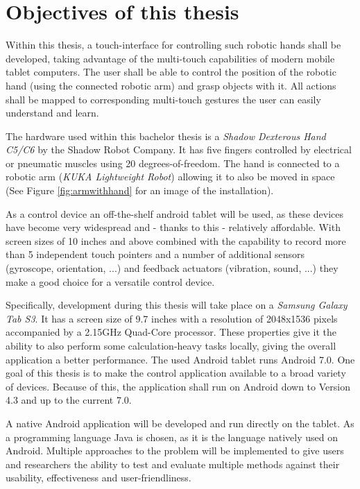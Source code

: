 \section{Objectives of this thesis}

Within this thesis, a touch-interface for controlling such robotic hands shall be developed, taking advantage of the multi-touch capabilities of modern mobile tablet computers. The user shall be able to control the position of the robotic hand (using the connected robotic arm) and grasp objects with it. All actions shall be mapped to corresponding multi-touch gestures the user can easily understand and learn.

The hardware used within this bachelor thesis is a \textit{Shadow Dexterous Hand C5/C6} by the Shadow Robot Company. It has five fingers controlled by electrical or pneumatic muscles using 20 degrees-of-freedom\cite{web:robothand:spec}. The hand is connected to a robotic arm (\textit{KUKA Lightweight Robot}) allowing it to also be moved in space (See Figure \ref{fig:armwithhand} for an image of the installation).

As a control device an off-the-shelf android tablet will be used, as these devices have become very widespread and - thanks to this - relatively affordable. With screen sizes of 10 inches and above combined with the capability to record more than 5 independent touch pointers and a number of additional sensors (gyroscope, orientation, ...) and feedback actuators (vibration, sound, ...) they make a good choice for a versatile control device.

Specifically, development during this thesis will take place on a \textit{Samsung Galaxy Tab S3}. It has a screen size of 9.7 inches\cite{samsung:galaxytabs3} with a resolution of 2048x1536 pixels accompanied by a 2.15GHz Quad-Core processor. These properties give it the ability to also perform some calculation-heavy tasks locally, giving the overall application a better performance. The used Android tablet runs Android 7.0. One goal of this thesis is to make the control application available to a broad variety of devices. Because of this, the application shall run on Android down to Version 4.3 and up to the current 7.0.

A native Android application will be developed and run directly on the tablet. As a programming language Java is chosen, as it is the language natively used on Android. Multiple approaches to the problem will be implemented to give users and researchers the ability to test and evaluate multiple methods against their usability, effectiveness and user-friendliness.


